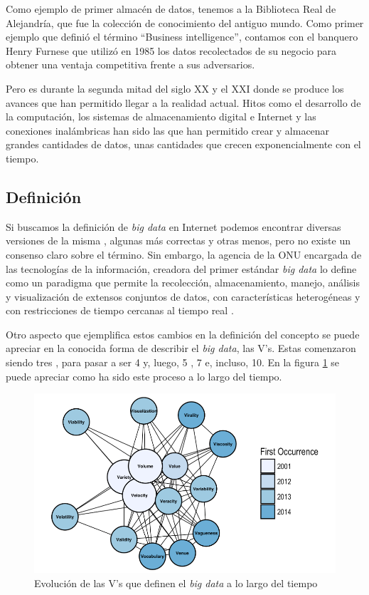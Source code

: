 Como ejemplo de primer almacén de datos, tenemos a la Biblioteca Real de Alejandría, que fue la colección de conocimiento del antiguo mundo. Como primer ejemplo que definió el término ``Business intelligence'', contamos con el banquero Henry Furnese que utilizó en 1985 los datos recolectados de su negocio para obtener una ventaja competitiva frente a sus adversarios.

Pero es durante la segunda mitad del siglo XX y el XXI donde se produce los avances que han permitido llegar a la realidad actual. Hitos como el desarrollo de la computación, los sistemas de almacenamiento digital e Internet y las conexiones inalámbricas han sido las que han permitido crear y almacenar grandes cantidades de datos, unas cantidades que crecen exponencialmente con el tiempo.

\subsection{Definición \label{defBigData}}
Si buscamos la definición de \textit{big data} en Internet podemos encontrar diversas versiones de la misma \cite{ayuso}, algunas más correctas y otras menos, pero no existe un consenso claro sobre el término. Sin embargo, la agencia de la \gls{ONU} encargada de las tecnologías de la  información, creadora del primer estándar \textit{big data} lo define como un paradigma que permite la recolección, almacenamiento, manejo, análisis y visualización de extensos conjuntos de datos, con características heterogéneas y con restricciones de tiempo cercanas al tiempo real \cite{estandar}. 

Otro aspecto que ejemplifica estos cambios en la definición del concepto se puede apreciar en la conocida forma de describir el \textit{big data}, las V's. Estas comenzaron siendo tres \cite{ayuso}, para pasar a ser 4 \cite{4v} y, luego, 5 \cite{monse}, 7 \cite{soriano} e, incluso, 10. En la figura \ref{lasv} se puede apreciar como ha sido este proceso a lo largo del tiempo.

\begin{figure}[htp!]
	\centering
	\caption{Evolución de las V's que definen el \textit{big data} a lo largo del tiempo \cite{fotoV}}
	\label{lasv}
	\vspace{5pt}
	\includegraphics[scale=0.5]{graphics/lasv}
\end{figure}

